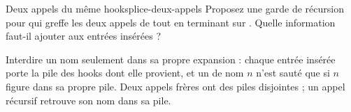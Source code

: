 \begin{exercice}{Deux appels du même hook}{splice-deux-appels}
Proposez une garde de récursion pour  qui greffe les deux appels de  tout en terminant sur . Quelle information faut-il ajouter aux entrées insérées ?
\end{exercice}
\begin{solution}
Interdire un nom seulement dans sa propre expansion : chaque entrée insérée porte la pile des hooks dont elle provient, et un  de nom $n$ n'est sauté que si $n$ figure dans sa propre pile. Deux appels frères ont des piles disjointes ; un appel récursif retrouve son nom dans sa pile.
\end{solution}

